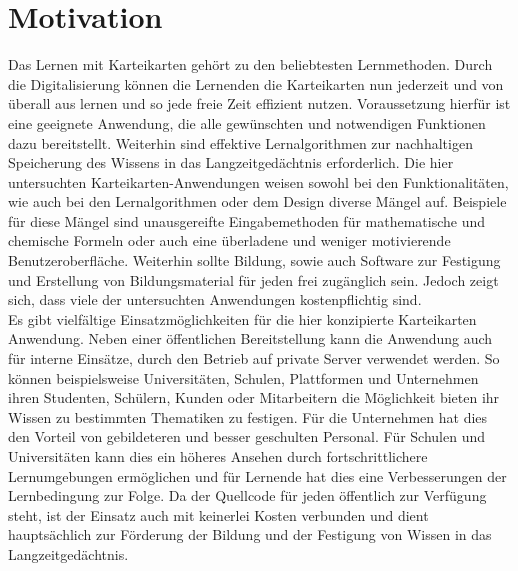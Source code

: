 %
%





\section{Motivation}
Das Lernen mit Karteikarten gehört zu den beliebtesten Lernmethoden. Durch die Digitalisierung können die Lernenden die Karteikarten nun jederzeit und von überall aus lernen und so jede freie Zeit effizient nutzen. Voraussetzung hierfür ist eine geeignete Anwendung, die alle gewünschten und notwendigen Funktionen dazu bereitstellt. Weiterhin sind effektive Lernalgorithmen zur nachhaltigen Speicherung des Wissens in das Langzeitgedächtnis erforderlich. Die hier untersuchten Karteikarten-Anwendungen weisen sowohl bei den Funktionalitäten, wie auch bei den Lernalgorithmen oder dem Design diverse Mängel auf. Beispiele für diese Mängel sind unausgereifte Eingabemethoden für mathematische und chemische Formeln oder auch eine überladene und weniger motivierende Benutzeroberfläche. Weiterhin sollte Bildung, sowie auch Software zur Festigung und Erstellung von Bildungsmaterial für jeden frei zugänglich sein. Jedoch zeigt sich, dass viele der untersuchten Anwendungen kostenpflichtig sind.\\

Es gibt vielfältige Einsatzmöglichkeiten für die hier konzipierte Karteikarten Anwendung. Neben einer öffentlichen Bereitstellung kann die Anwendung auch für interne Einsätze, durch den Betrieb auf private Server verwendet werden. So können beispielsweise Universitäten, Schulen, Plattformen und Unternehmen ihren Studenten, Schülern, Kunden oder Mitarbeitern die Möglichkeit bieten ihr Wissen zu bestimmten Thematiken zu festigen. Für die Unternehmen hat dies den Vorteil von gebildeteren und besser geschulten Personal. Für Schulen und Universitäten kann dies ein höheres Ansehen durch fortschrittlichere Lernumgebungen ermöglichen und für Lernende hat dies eine Verbesserungen der Lernbedingung zur Folge. Da der Quellcode für jeden öffentlich zur Verfügung steht, ist der Einsatz auch mit keinerlei Kosten verbunden und dient hauptsächlich zur Förderung der Bildung und der Festigung von Wissen in das Langzeitgedächtnis. \\


